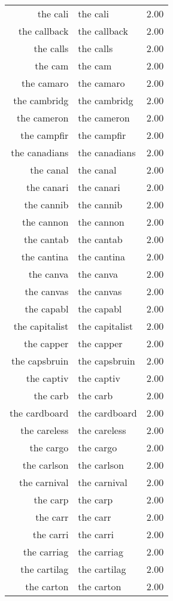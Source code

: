 \begin{table}[ht]
\begin{tabular}{rlr}
  the cali & the cali & 2.00 \\ 
  the callback & the callback & 2.00 \\ 
  the calls & the calls & 2.00 \\ 
  the cam & the cam & 2.00 \\ 
  the camaro & the camaro & 2.00 \\ 
  the cambridg & the cambridg & 2.00 \\ 
  the cameron & the cameron & 2.00 \\ 
  the campfir & the campfir & 2.00 \\ 
  the canadians & the canadians & 2.00 \\ 
  the canal & the canal & 2.00 \\ 
  the canari & the canari & 2.00 \\ 
  the cannib & the cannib & 2.00 \\ 
  the cannon & the cannon & 2.00 \\ 
  the cantab & the cantab & 2.00 \\ 
  the cantina & the cantina & 2.00 \\ 
  the canva & the canva & 2.00 \\ 
  the canvas & the canvas & 2.00 \\ 
  the capabl & the capabl & 2.00 \\ 
  the capitalist & the capitalist & 2.00 \\ 
  the capper & the capper & 2.00 \\ 
  the capsbruin & the capsbruin & 2.00 \\ 
  the captiv & the captiv & 2.00 \\ 
  the carb & the carb & 2.00 \\ 
  the cardboard & the cardboard & 2.00 \\ 
  the careless & the careless & 2.00 \\ 
  the cargo & the cargo & 2.00 \\ 
  the carlson & the carlson & 2.00 \\ 
  the carnival & the carnival & 2.00 \\ 
  the carp & the carp & 2.00 \\ 
  the carr & the carr & 2.00 \\ 
  the carri & the carri & 2.00 \\ 
  the carriag & the carriag & 2.00 \\ 
  the cartilag & the cartilag & 2.00 \\ 
  the carton & the carton & 2.00 \\ 

\end{tabular}
\end{table}
